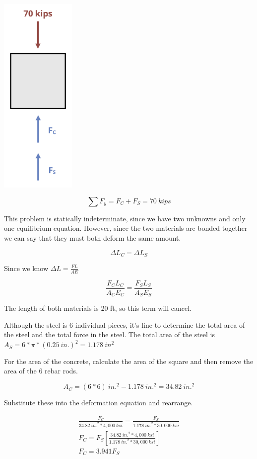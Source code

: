 \documentclass[
  letterpaper,
  DIV=11,
  numbers=noendperiod]{scrreprt}
\theoremstyle{definition}
\theoremstyle{remark}
\begin{document}
\begin{tcolorbox}
\begin{tcolorbox}
\begin{center}
\includegraphics[width=1.42708in,height=\textheight]{images/PNGs/Example 5.7 copy.png}
\end{center}

\[
\sum F_y= F_C+F_S=70{~kips}
\]

This problem is statically indeterminate, since we have two unknowns and
only one equilibrium equation. However, since the two materials are
bonded together we can say that they must both deform the same amount.

\[
\Delta L_C=\Delta L_S
\]

Since we know \(\Delta L=\frac{F L}{A E}\)

\[
\frac{F_C L_C}{A_C E_C}=\frac{F_S L_S}{A_S E_S}
\]

The length of both materials is 20 ft, so this term will cancel.

Although the steel is 6 individual pieces, it's fine to determine the
total area of the steel and the total force in the steel. The total area
of the steel is \(A_S=6 * \pi * (0.25{~in.})^2=1.178{~in}^2\)

For the area of the concrete, calculate the area of the square and then
remove the area of the 6 rebar rods.

\[
A_C=(6 * 6){~in.}^2-1.178{~in.^2}=34.82{~in.}^2
\]

Substitute these into the deformation equation and rearrange.

\[
\begin{gathered}
\frac{F_C}{34.82{~in.}^2 * 4,000{~ksi}}=\frac{F_S}{1.178{~in.}^2 * 30,000{~ksi}} \\
F_C=F_S\left[\frac{34.82{~in.}^2 * 4,000{~ksi}}{1.178{~in.}^2 * 30,000{~ksi}}\right] \\
F_C=3.941 F_S
\end{gathered}
\]


\end{tcolorbox}
\end{tcolorbox}
\end{document}
